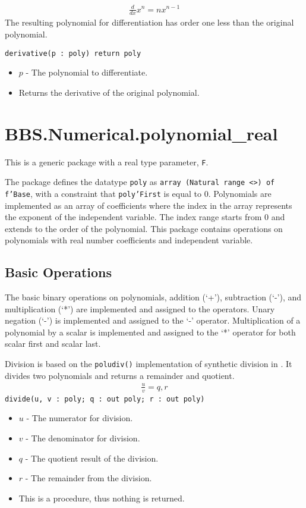 \documentclass[10pt, openany]{book}
\newcommand{\function}[1]{\texttt{#1}}
\newcommand{\datatype}[1]{\texttt{#1}}
\begin{document}
\begin{align*}
  \frac{d}{dx}x^n = n x^{n-1}
\end{align*}
The resulting polynomial for differentiation has order one less than the original polynomial.

\function{derivative(p : poly) return poly}
\begin{itemize}
  \item $p$ - The polynomial to differentiate.
  \item Returns the derivative of the original polynomial.
\end{itemize}

\section{BBS.Numerical.polynomial\_real}
This is a generic package with a real type parameter, \datatype{F}.

The package defines the datatype \datatype{poly} as \datatype{array (Natural range  <>) of f'Base}, with a constraint that \datatype{poly'First} is equal to 0.  Polynomials are implemented as an array of coefficients where the index in the array represents the exponent of the independent variable.  The index range starts from 0 and extends to the order of the polynomial.  This package contains operations on polynomials with real number coefficients and independent variable.

\subsection{Basic Operations}
The basic binary operations on polynomials, addition (`+'), subtraction (`-'), and multiplication (`*') are implemented and assigned to the operators.  Unary negation (`-') is implemented and assigned to the `-' operator.  Multiplication of a polynomial by a scalar is implemented and assigned to the `*' operator for both scalar first and scalar last.

Division is based on the \function{poludiv()} implementation of synthetic division in \cite{NR-C}.  It divides two polynomials and returns a remainder and quotient.
\begin{align*}
  \frac{u}{v} = q, r
\end{align*}
\function{divide(u, v : poly; q : out poly; r : out poly)}
\begin{itemize}
  \item $u$ - The numerator for division.
  \item $v$ - The denominator for division.
  \item $q$ - The quotient result of the division.
  \item $r$ - The remainder from the division.
  \item This is a procedure, thus nothing is returned.
\end{itemize}
\end{document}
